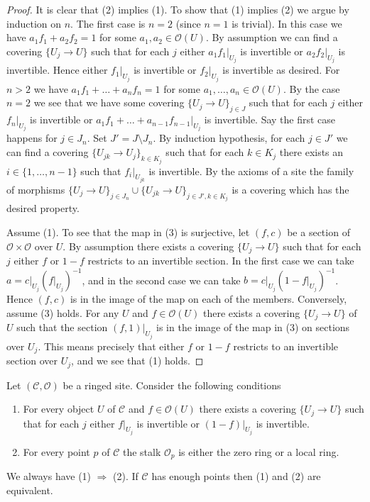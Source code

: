 \begin{proof}
It is clear that (2) implies (1). To show that (1) implies (2) we argue by
induction on $n$. The first case is $n = 2$ (since $n = 1$ is trivial).
In this case we have $a_1f_1 + a_2f_2 = 1$ for some
$a_1, a_2 \in \mathcal{O}(U)$. By assumption we can find a covering
$\{U_j \to U\}$ such that for each $j$
either $a_1f_1|_{U_j}$ is invertible or $a_2f_2|_{U_j}$ is invertible.
Hence either $f_1|_{U_j}$ is invertible or $f_2|_{U_j}$ is invertible
as desired. For $n > 2$ we have
$a_1f_1 + \ldots + a_nf_n = 1$ for some $a_1, \ldots, a_n \in \mathcal{O}(U)$. 
By the case $n = 2$ we see that we have some covering $\{U_j \to U\}_{j \in J}$
such that for each $j$ either $f_n|_{U_j}$ is invertible or
$a_1f_1 + \ldots + a_{n - 1}f_{n - 1}|_{U_j}$ is invertible.
Say the first case happens for $j \in J_n$. Set $J' = J \setminus J_n$.
By induction hypothesis, for each $j \in J'$ we can find a covering
$\{U_{jk} \to U_j\}_{k \in K_j}$ such that for each $k \in K_j$ there
exists an $i \in \{1, \ldots, n - 1\}$ such that 
$f_i|_{U_{jk}}$ is invertible. By the axioms of a site the family of
morphisms
$\{U_j \to U\}_{j \in J_n} \cup \{U_{jk} \to U\}_{j \in J', k \in K_j}$
is a covering which has the desired property.

\medskip\noindent
Assume (1). To see that the map in (3) is surjective, let
$(f, c)$ be a section of $\mathcal{O} \times \mathcal{O}$ over $U$.
By assumption there exists a covering $\{U_j \to U\}$ such that
for each $j$ either $f$ or $1 - f$ restricts to an invertible section.
In the first case we can take $a = c|_{U_j} (f|_{U_j})^{-1}$, and
in the second case we can take $b = c|_{U_j} (1 - f|_{U_j})^{-1}$.
Hence $(f, c)$ is in the image of the map on each of the members.
Conversely, assume (3) holds. For any $U$ and $f \in \mathcal{O}(U)$
there exists a covering $\{U_j \to U\}$ of $U$ such that the
section $(f, 1)|_{U_j}$ is in the image of the map in (3) on sections
over $U_j$. This means precisely that either $f$ or $1 - f$ restricts
to an invertible section over $U_j$, and we see that (1) holds.
\end{proof}

\begin{lemma}
\label{lemma-locally-ringed-stalk}
Let $(\mathcal{C}, \mathcal{O})$ be a ringed site.
Consider the following conditions
\begin{enumerate}
\item For every object $U$ of $\mathcal{C}$ and $f \in \mathcal{O}(U)$
there exists a covering $\{U_j \to U\}$ such that for each $j$
either $f|_{U_j}$ is invertible or $(1 - f)|_{U_j}$ is invertible.
\item For every point $p$ of $\mathcal{C}$ the stalk $\mathcal{O}_p$
is either the zero ring or a local ring.
\end{enumerate}
We always have (1) $\Rightarrow$ (2). If $\mathcal{C}$ has enough points
then (1) and (2) are equivalent.
\end{lemma}

